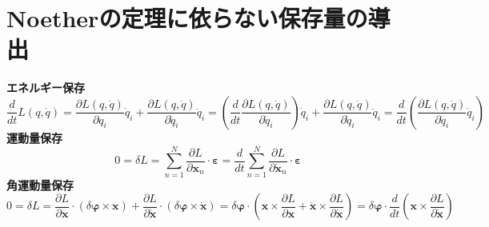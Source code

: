 \documentclass{jsarticle}
\begin{document}
\section{Noetherの定理に依らない保存量の導出}
\noindent
\textbf{エネルギー保存}
\[\frac{d}{dt}L(q,\dot{q})=\frac{\partial L(q,\dot{q})}{\partial q_{i}}\dot{q}_{i}+
\frac{\partial L(q,\dot{q})}{\partial\dot{q}_{i}}\ddot{q}_{i}
=\left(\frac{d}{dt}\frac{\partial L(q,\dot{q})}{\partial\dot{q}_{i}}\right)\dot{q}_{i}
+\frac{\partial L(q,\dot{q})}{\partial\dot{q}_{i}}\ddot{q}_{i}
=\frac{d}{dt}\left(\frac{\partial L(q,\dot{q})}{\partial\dot{q}_{i}}\dot{q}_{i}\right)\]
\textbf{運動量保存}
\[0=\delta L=\sum_{n=1}^{N}\frac{\partial L}{\partial\bm{x}_{n}}\cdot\bm{\varepsilon}
=\frac{d}{dt}\sum_{n=1}^{N}\frac{\partial L}{\partial\dot{\bm{x}}_{n}}\cdot\bm{\varepsilon}\]
\textbf{角運動量保存}
\[0=\delta L=\frac{\partial L}{\partial\bm{x}}\cdot(\delta\bm{\varphi}\times\bm{x})
+\frac{\partial L}{\partial\dot{\bm{x}}}\cdot(\delta\bm{\varphi}\times\dot{\bm{x}})
=\delta\bm{\varphi}\cdot\left(\bm{x}\times\frac{\partial L}{\partial\bm{x}}+\dot{\bm{x}}\times\frac{\partial L}{\partial\dot{\bm{x}}}\right)
=\delta\bm{\varphi}\cdot\frac{d}{dt}\left(\bm{x}\times\frac{\partial L}{\partial\dot{\bm{x}}}\right)\]
\end{document}

